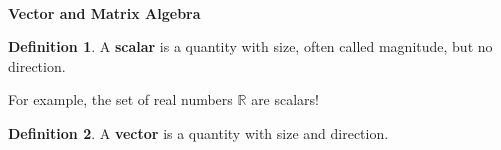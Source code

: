 \documentclass[12pt]{amsart}
\newcommand{\R}{\mathbb{R}}
\theoremstyle{definition}
\newtheorem*{definition}{Definition}
\begin{document}
	
\thispagestyle{fancy}
\pagestyle{fancy}
	
	\
 
\begin{center}
    {\Large \bf {\sc Vector and Matrix Algebra}}
\end{center}

\begin{definition}
    A \textbf{scalar} is a quantity with size, often called magnitude, but no direction. 
\end{definition}

\noindent For example, the set of real numbers $\R$ are scalars!

\begin{definition}
    A \textbf{vector} is a quantity with size and direction.
\end{definition}
\end{document}
